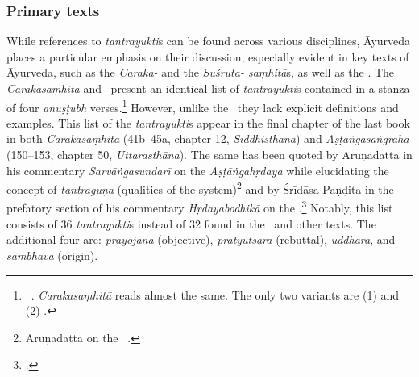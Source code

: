 \subsubsection{Primary texts}
While references to \emph{tantrayukti}s can be found across various disciplines, 
Āyurveda places a particular emphasis on their discussion, 
especially evident in key texts of Āyurveda, 
such as the \emph{Caraka-} and the \emph{Suśruta- saṃhitā}s, 
as well as the \AS. The \emph{Carakasaṃhitā} and \AS\ present an identical list 
of \emph{tantrayukti}s contained in a stanza of four \emph{anuṣṭubh} 
verses.\footnote{\label{CaAsT}
	\begin{verse}
	\end{verse}
	\AS\ . \emph{Carakasaṃhitā} 
 reads almost the same. The only two variants are (1) 
 and (2) .
	} 
However, unlike the \SS\ they lack explicit definitions and examples. 
This list of the \emph{tantrayukti}s appear in the final chapter of the last book 
in both \emph{Carakasaṃhitā} (41b--45a, chapter 12, \emph{Siddhisthāna}) 
and 
\emph{Aṣṭāṅgasaṅgraha} (150--153, chapter 50, \emph{Uttarasthāna}). 
The same has been quoted by Aruṇadatta in his commentary 
\emph{Sarvāṅgasundarī} on the \emph{Aṣṭāṅgahṛdaya} 
while elucidating the concept of \emph{tantraguṇa} (qualities of the 
system)\footnote{Aruṇadatta on the \AHS\ .}  
and by Śrīdāsa Paṇḍita in the prefatory section of his commentary 
\emph{Hṛdayabodhikā} on the \AHS.\footcite[1--2]{muss-1940}
Notably, this list consists of 36 \emph{tantrayukti}s instead of 32 found in the 
\SS\ and other texts. The additional four are: \emph{prayojana} (objective), 
\emph{pratyutsāra} (rebuttal), \emph{uddhāra}, and \emph{sambhava} 
(origin). 


